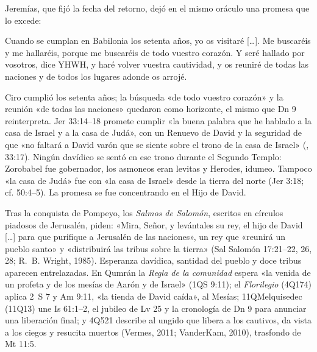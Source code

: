 Jeremías, que fijó la fecha del retorno, dejó en el mismo oráculo una promesa que lo excede:
\begin{cita}Cuando se cumplan en Babilonia los setenta años, yo os visitaré [\ldots]. Me buscaréis y me hallaréis, porque me buscaréis de todo vuestro corazón. Y seré hallado por vosotros, dice YHWH, y haré volver vuestra cautividad, y os reuniré de todas las naciones y de todos los lugares adonde os arrojé.\end{cita}
Ciro cumplió los setenta años; la búsqueda «de todo vuestro corazón» y la reunión «de todas las naciones» quedaron como horizonte, el mismo que Dn 9 reinterpreta. Jer 33:14--18 promete cumplir «la buena palabra que he hablado a la casa de Israel y a la casa de Judá», con un Renuevo de David y la seguridad de que «no faltará a David varón que se siente sobre el trono de la casa de Israel» (, 33:17). Ningún davídico se sentó en ese trono durante el Segundo Templo: Zorobabel fue gobernador, los asmoneos eran levitas y Herodes, idumeo. Tampoco «la casa de Judá» fue con «la casa de Israel» desde la tierra del norte (Jer 3:18; cf. 50:4--5). La promesa se fue concentrando en el Hijo de David.

Tras la conquista de Pompeyo, los \emph{Salmos de Salomón}, escritos en círculos piadosos de Jerusalén, piden: «Mira, Señor, y levántales su rey, el hijo de David [\ldots] para que purifique a Jerusalén de las naciones», un rey que «reunirá un pueblo santo» y «distribuirá las tribus sobre la tierra» (Sal Salomón 17:21--22, 26, 28; R.~B. Wright, 1985). Esperanza davídica, santidad del pueblo y doce tribus aparecen entrelazadas. En Qumrán la \emph{Regla de la comunidad} espera «la venida de un profeta y de los mesías de Aarón y de Israel» (1QS 9:11); el \emph{Florilegio} (4Q174) aplica 2~S 7 y Am 9:11, «la tienda de David caída», al Mesías; 11QMelquisedec (11Q13) une Is 61:1--2, el jubileo de Lv 25 y la cronología de Dn 9 para anunciar una liberación final; y 4Q521 describe al ungido que libera a los cautivos, da vista a los ciegos y resucita muertos (Vermes, 2011; VanderKam, 2010), trasfondo de Mt 11:5.

